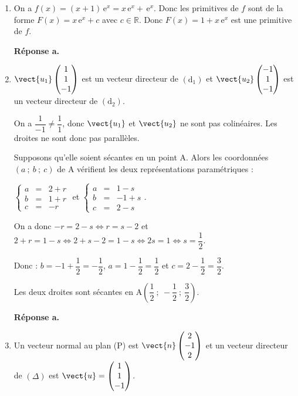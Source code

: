\begin{enumerate}
	\item On a $f(x) = (x+1)\,\text{e}^{x} = x\,\text{e}^{x} + \,\text{e}^{x}$. Donc les primitives de $f$ sont de la forme $F(x) = x\,\text{e}^{x} + c$ avec $c \in \mathbb{R}$. Donc $F(x) = 1 + x\,\text{e}^{x}$ est une primitive de $f$.
	
	\textbf{Réponse a.}
	\item $\vect{u_1} \begin{pmatrix}1\\1\\-1\end{pmatrix}$ est un vecteur directeur de $\left(\text{d}_1\right)$ et $\vect{u_2} \begin{pmatrix}-1\\1\\-1\end{pmatrix}$ est un vecteur directeur de $\left(\text{d}_2\right)$.
	
On a $\dfrac{1}{-1} \neq \dfrac{1}{1}$, donc $\vect{u_1}$ et $\vect{u_2}$ ne sont pas colinéaires. Les droites ne sont donc pas parallèles.
	
Supposons qu'elle soient sécantes en un point A. Alors les coordonnées $(a~;~b~;~c)$ de A vérifient les deux représentations paramétriques :
	
$\left\{\begin{array}{rcl}a &=& 2 + r \\ b &=& 1 + r \\ c &=& -r\end{array}\right.$ et $\left\{\begin{array}{rcl}a &=& 1 - s \\ b &=& -1 + s \\ c &=& 2 - s\end{array}\right.$.
	
On a donc $-r = 2 - s \iff r = s - 2$ et $2 + r = 1 - s \iff 2 + s - 2 = 1 - s \iff 2s = 1 \iff s = \dfrac{1}{2}$.
	
Donc : $b = -1 + \dfrac{1}{2} = -\dfrac{1}{2}$, $a = 1 - \dfrac{1}{2} = \dfrac{1}{2}$ et $c = 2 - \dfrac{1}{2} = \dfrac{3}{2}$.
	
Les deux droites sont sécantes en $\text{A}\left(\dfrac{1}{2}~;~-\dfrac{1}{2}~;~\dfrac{3}{2}\right)$.
	
	\textbf{Réponse a.}
	\item Un vecteur normal au plan (P) est $\vect{n} \begin{pmatrix}2\\-1\\2\end{pmatrix}$ et un vecteur directeur de $(\Delta)$ est $\vect{u} = \begin{pmatrix}1\\1\\-1\end{pmatrix}$.
	

\end{enumerate}

